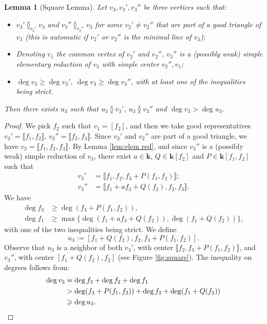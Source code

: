 \documentclass[reqno,oneside,11pt]{amsart}
\theoremstyle{plain}
\newtheorem{lemma}[theorem]{Lemma}
\theoremstyle{definition}
\newcommand{\K}{\mathbf{k}}
\renewcommand{\ne}{\between}
\newcommand{\llb}{\llbracket}
\newcommand{\rrb}{\rrbracket}
\renewcommand{\ge}{\geqslant}
\begin{document}
\begin{lemma}[Square Lemma] \label{lem:square}
Let $v_3, v_3', v_3''$ be three vertices such that:
\begin{itemize}[wide]
\item $v_3' \ne_{v_2'} v_3$ and $v_3'' \ne_{v_2''} v_3$ for some $v_2' \neq
v_2''$ that are part of a good triangle of $v_3$ (this is automatic if $v_2'$
or $v_2''$ is the minimal line of $v_3$);
\item Denoting $v_1$ the common vertex of $v_2'$ and $v_2''$, $v_3''$ is a (possibly weak) simple elementary reduction of $v_3$ with simple center $v_2'', v_1$;
\item $\deg v_3 \ge \deg v_3'$, $\deg v_3 \ge \deg v_3''$, with at least one of the inequalities being strict.
\end{itemize}
Then there exists $u_3$ such that $u_3 \ne v_3'$, $u_3 \ne v_3''$ and $\deg v_3
> \deg u_3$.
\end{lemma}

\begin{proof}
We pick $f_2$ such that $v_1= [f_2]$, and then we take good representatives $v_2' = \llb f_1, f_2 \rrb$, $v_2'' = \llb f_2,f_3 \rrb$.
Since $v_2'$ and $v_2''$ are part of a good triangle, we have $v_3 = \llb f_1, f_2, f_3 \rrb$.
By Lemma \ref{lem:elem red}, and since $v_3''$ is a (possibly weak) simple
reduction of $v_3$, there exist $a \in \K$, $Q \in \K[f_2]$ and $P \in
\K[f_1,f_2]$ such that
\begin{align*}
v_3' &= \llb f_1, f_2, f_3 + P(f_1,f_2)\rrb; \\
v_3'' &= \llb f_1 + a f_3 + Q(f_2), f_2, f_3 \rrb.
\end{align*}
We have
\begin{align*}
\deg f_3 &\ge \deg (f_3 + P(f_1,f_2)), \\
\deg f_1 &\ge \max\{ \deg (f_1 + a f_3 + Q(f_2)),\deg (f_1 + Q(f_2)) \},
\end{align*}
with one of the two inequalities being strict.
We define
$$u_3 := [f_1 + Q(f_2), f_2, f_3 + P(f_1,f_2) ].$$
Observe that $u_3$ is a neighbor of both $v_3'$, with center $\llb f_2, f_3 + P(f_1,f_2) \rrb$, and $v_3''$, with center $[f_1 + Q(f_2), f_2]$ (see Figure \ref{fig:square}).
The inequality on degrees follows from:
\begin{align*}
\deg v_3 &= \deg f_3 + \deg f_2 + \deg f_1 \\
&> \deg (f_3 + P(f_1,f_2)) + \deg f_2 + \deg (f_1 + Q(f_2))\\
&\ge \deg u_3. \qedhere
\end{align*}
\end{proof}
\end{document}

